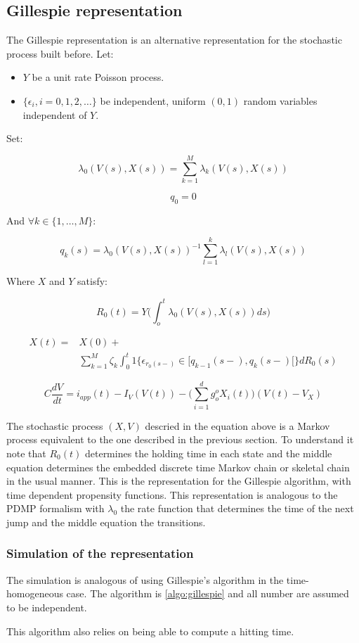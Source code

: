 	\subsection{Gillespie representation}
	The Gillespie representation is an alternative representation for the stochastic process built before.
	Let:

	\begin{itemize}
		\item $Y$ be a unit rate Poisson process.
		\item $\{\epsilon_i, i = 0, 1, 2, \dots\}$ be independent, uniform $(0,1)$ random variables independent of $Y$.
	\end{itemize}

	Set:

	$$\lambda_0(V(s), X(s)) = \sum\limits_{k=1}^M\lambda_k(V(s), X(s))$$

	$$q_0 = 0$$

	And $\forall k\in\{1, \dots, M\}$:

	$$q_k(s) = \lambda_0(V(s), X(s))^{-1}\sum\limits_{l=1}^k\lambda_l(V(s), X(s))$$

	Where $X$ and $Y$ satisfy:

	$$R_0(t) = Y\biggl(\int_o^t\lambda_0(V(s), X(s))ds\biggr)$$

	\begin{align*}
		X(t) =& X(0) + \\
					&\sum\limits_{k=1}^M\zeta_k\int_0^t1\{\epsilon_{r_0(s-)}\in[q_{k-1}(s-), q_k(s-)[\}dR_0(s)
	\end{align*}

	$$C\frac{dV}{dt} = i_{app}(t)-I_V(V(t)) - \biggl(\sum\limits_{i=1}^dg_o^oX_i(t)\biggr)(V(t)-V_X)$$

	The stochastic process $(X, V)$ descried in the equation above is a Markov process equivalent to the one described in the previous section.
	To understand it note that $R_0(t)$ determines the holding time in each state and the middle equation determines the embedded discrete time Markov chain or skeletal chain in the usual manner.
	This is the representation for the Gillespie algorithm, with time dependent propensity functions.
	This representation is analogous to the PDMP formalism with $\lambda_0$ the rate function that determines the time of the next jump and the middle equation the transitions.

		\subsubsection{Simulation of the representation}
		The simulation is analogous of using Gillespie's algorithm in the time-homogeneous case.
		The algorithm is \ref{algo:gillespie} and all number are assumed to be independent.

		

		This algorithm also relies on being able to compute a hitting time.
